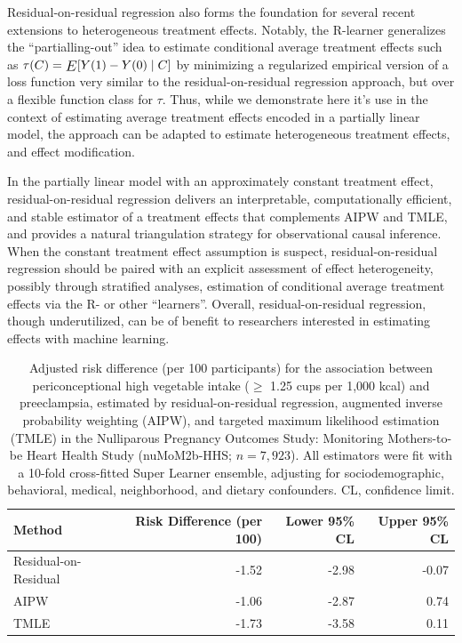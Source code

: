 \documentclass[12pt]{article}
\newcommand{\E}{\mathop{\vcenter{\hbox{\relsize{+1}$E$}}}}
\begin{document}
Residual-on-residual regression also forms the foundation for several recent extensions to heterogeneous treatment effects. Notably, the R-learner generalizes the ``partialling-out'' idea to estimate conditional average treatment effects such as $\tau(C) = \E[Y(1) - Y(0) \mid C]$ by minimizing a regularized empirical version of a loss function very similar to the residual-on-residual regression approach, but over a flexible function class for $\tau$.\cite{Nie2021} Thus, while we demonstrate here it's use in the context of estimating average treatment effects encoded in a partially linear model, the approach can be adapted to estimate heterogeneous treatment effects, and effect modification. 

In the partially linear model with an approximately constant treatment effect, residual-on-residual regression delivers an interpretable, computationally efficient, and stable estimator of a treatment effects that complements AIPW and TMLE, and provides a natural triangulation strategy for observational causal inference. When the constant treatment effect assumption is suspect, residual-on-residual regression should be paired with an explicit assessment of effect heterogeneity, possibly through stratified analyses, estimation of conditional average treatment effects via the R- or other ``learners''.\cite{Kennedy2023} Overall, residual-on-residual regression, though underutilized, can be of benefit to researchers interested in estimating effects with machine learning. 

\newpage

\begin{table}[ht]
\centering
\caption{Adjusted risk difference (per 100 participants) for the association between periconceptional high vegetable intake ($\geq$ 1.25 cups per 1{,}000 kcal) and preeclampsia, estimated by residual-on-residual regression, augmented inverse probability weighting (AIPW), and targeted maximum likelihood estimation (TMLE) in the Nulliparous Pregnancy Outcomes Study: Monitoring Mothers-to-be Heart Health Study (nuMoM2b-HHS; $n = 7{,}923$). All estimators were fit with a 10-fold cross-fitted Super Learner ensemble, adjusting for sociodemographic, behavioral, medical, neighborhood, and dietary confounders. CL, confidence limit.} 
\label{tab:numom_results}
\begin{tabular}{lrrr}
  \toprule
Method & Risk Difference (per 100) & Lower 95\% CL & Upper 95\% CL \\ 
  \midrule
Residual-on-Residual & -1.52 & -2.98 & -0.07 \\
  AIPW & -1.06 & -2.87 & 0.74 \\
  TMLE & -1.73 & -3.58 & 0.11 \\
   \bottomrule
\end{tabular}
\end{table}
\end{document}
